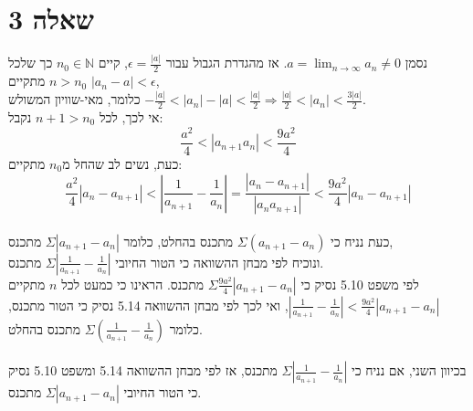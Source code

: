 \documentclass{article}
\begin{document}
\section*{שאלה 3}

נסמן $a=\lim_{n\rightarrow\infty}a_n\ne 0$.
אז מהגדרת הגבול עבור $\epsilon=\frac{|a|}{2}$,
קיים $n_0\in \mathbb{N}$ כך שלכל $n>n_0$ מתקיים $|a_n-a|<\epsilon$, \\
כלומר, מאי-שוויון המשולש $-\frac{|a|}{2}<|a_n|-|a|<\frac{|a|}{2}\Rightarrow \frac{|a|}{2}<|a_n|<\frac{3|a|}{2}$. \\
אי לכך, לכל $n+1>n_0$ נקבל:
\[
    \frac{a^2}{4}<|a_{n+1}a_n|<\frac{9a^2}{4}
\]
כעת, נשים לב שהחל מ$n_0$ מתקיים:
\[
    \frac{a^2}{4}|a_n-a_{n+1}|<
    |\frac{1}{a_{n+1}}-\frac{1}{a_n}|=
    \frac{|a_n-a_{n+1}|}{|a_na_{n+1}|}<
    \frac{9a^2}{4}|a_n-a_{n+1}|
\]
\\
כעת נניח כי $\Sigma (a_{n+1}-a_{n})$ מתכנס בהחלט, כלומר
$\Sigma|a_{n+1}-a_n|$ מתכנס,\\
ונוכיח לפי מבחן ההשוואה כי הטור החיובי $\Sigma |\frac{1}{a_{n+1}}-\frac{1}{a_n}|$ מתכנס.\\
לפי משפט 5.10 נסיק כי $\Sigma \frac{9a^2}{4}|a_{n+1}-a_n|$ מתכנס.
הראינו כי כמעט לכל $n$ מתקיים $|\frac{1}{a_{n+1}}-\frac{1}{a_n}|<\frac{9a^2}{4}|a_{n+1}-a_n|$,
ואי לכך לפי מבחן ההשוואה 5.14 נסיק כי הטור מתכנס, כלומר $\Sigma(\frac{1}{a_{n+1}}-\frac{1}{a_n})$ מתכנס בהחלט.
\\\\
בכיוון השני, אם נניח כי $\Sigma |\frac{1}{a_{n+1}}-\frac{1}{a_n}|$ מתכנס,
אז לפי מבחן ההשוואה 5.14 ומשפט 5.10 נסיק כי הטור החיובי $\Sigma |a_{n+1}-a_n|$ מתכנס.
\end{document}
